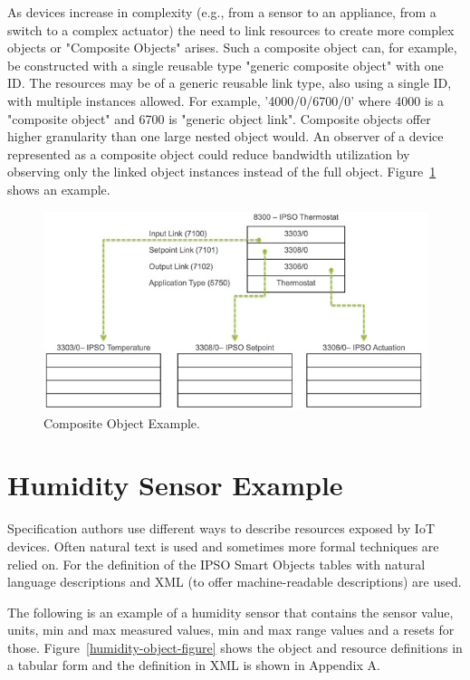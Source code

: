 \documentclass[peerreview, a4paper, 7pt]{IEEEtran}
\begin{document}
As devices increase in complexity (e.g., from a sensor to an appliance, from a switch to a complex actuator) the need to link resources to create more complex objects or "Composite Objects" arises. Such a composite object can, for example, be constructed with a single reusable type "generic composite object" with one ID. The resources may be of a generic reusable link type, also using a single ID, with multiple instances allowed. For example, '4000/0/6700/0' where 4000 is a "composite object" and 6700 is "generic object link". Composite objects offer higher granularity than one large nested object would. An observer of a device represented as a composite object could reduce bandwidth utilization by observing only the linked object instances instead of the full object. Figure~\ref{composite-object-figure} shows an example.

\begin{figure}[!t]
 \centering
 \includegraphics[scale=0.50]{composite-object.jpg}
 \caption{Composite Object Example.}
 \label{composite-object-figure}
\end{figure}

\section{Humidity Sensor Example}

Specification authors use different ways to describe resources exposed by IoT devices. Often natural text is used and sometimes more formal techniques are relied on. For the definition of the IPSO Smart Objects tables with natural language descriptions and XML (to offer machine-readable descriptions) are used.

The following is an example of a humidity sensor that contains the sensor value, units, min and max measured values, min and max range values and a resets for those. Figure~\ref{humidity-object-figure} shows the object and resource definitions in a tabular form and the definition in XML is shown in Appendix A. 
\end{document}
